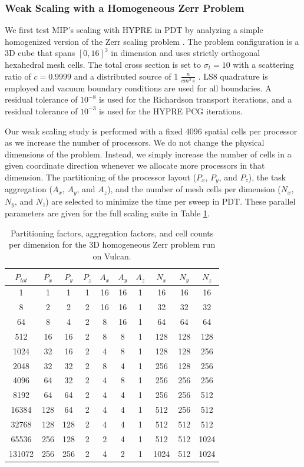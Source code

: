 \subsubsection{Weak Scaling with a Homogeneous Zerr Problem}
\label{sec::DSA_Results_Scaling_Zerr}

We first test MIP's scaling with HYPRE in PDT by analyzing a simple homogenized version of the Zerr scaling problem \cite{zerr2011solution}. The problem configuration is a 3D cube that spans $[0,16]^3$ in dimension and uses strictly orthogonal hexahedral mesh cells. The total cross section is set to $\sigma_t=10$ with a scattering ratio of $c=0.9999$ and a distributed source of 1 $\frac{n}{cm^3 \, s}$ . LS8 quadrature is employed and vacuum boundary conditions are used for all boundaries. A residual tolerance of $10^{-8}$ is used for the Richardson transport iterations, and a residual tolerance of $10^{-3}$ is used for the HYPRE PCG iterations.

Our weak scaling study is performed with a fixed 4096 spatial cells per processor as we increase the number of processors. We do not change the physical dimensions of the problem. Instead, we simply increase the number of cells in a given coordinate direction whenever we allocate more processors in that dimension. The partitioning of the processor layout ($P_x$, $P_y$, and $P_z$), the task aggregation ($A_x$, $A_y$, and $A_z$), and the number of mesh cells per dimension ($N_x$, $N_y$, and $N_z$) are selected to minimize the time per sweep in PDT. These parallel parameters are given for the full scaling suite in Table \ref{tab::DSA_Vulcan_agg_part}.

\begin{table}[h]
\centering
\caption{Partitioning factors, aggregation factors, and cell counts per dimension for the 3D homogeneous Zerr problem run on Vulcan.}
\begin{tabular}{|c|c|c|c|c|c|c|c|c|c|}
\hline
$P_{tot}$&$P_{x}$&$P_{y}$&$P_{z}$&$A_{x}$&$A_{y}$&$A_{z}$ &$N_{x}$&$N_{y}$&$N_{z}$ \\
\hline \hline
1&1&1&1&16&16&1& 16&16&16 \\
8&2&2&2&16&16&1&32&32&32\\
64&8&4&2&8&16&1&64&64&64\\
512&16&16&	2&8&	8&1&128&128&128\\
1024&	32&16&2&4&8&1&128&128&256\\
2048&	32&32&2&8&4&1&256&128&256\\
4096&	64&32&2&4&8&1&256&256&256\\
8192&	64&64&2&4&4&1&256&256&512\\
16384&128&	64&2&4&4&1&512&256&	512\\
32768&128&	128&2&4&4&1&512&512&	512\\
65536&256&	128&2&2&4&1&512&512&	1024\\
131072&256&256&2&4&2&1&1024&512&1024\\
\hline
\end{tabular}
\label{tab::DSA_Vulcan_agg_part}
\end{table}

